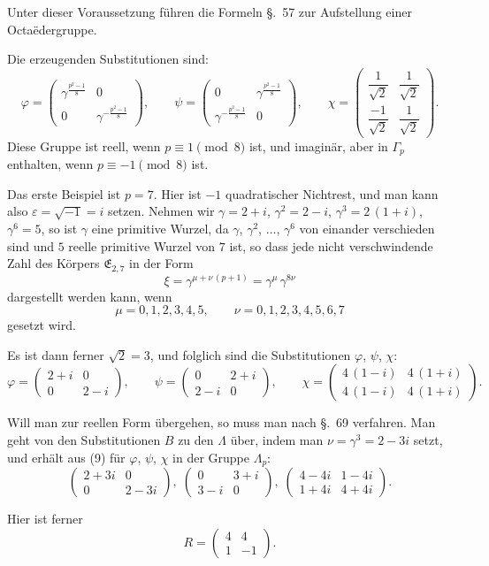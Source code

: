\documentclass[12pt,a4paper]{article}
\begin{document}
\newpage
{}

Unter dieser Voraussetzung führen die Formeln \S.~57 zur Aufstellung einer Octaëdergruppe.

Die erzeugenden Substitutionen sind:
\[
\varphi = \begin{pmatrix}
\gamma^{\frac{p^{2}-1}{8}}&0\\[4pt]
0&\gamma^{-\frac{p^{2}-1}{8}}
\end{pmatrix},\qquad
\psi = \begin{pmatrix}
0&\gamma^{\frac{p^{2}-1}{8}}\\[4pt]
\gamma^{-\frac{p^{2}-1}{8}}&0
\end{pmatrix},\qquad
\chi = \begin{pmatrix}
\dfrac{1}{\sqrt{2}}&\dfrac{1}{\sqrt{2}}\\[8pt]
\dfrac{-1}{\sqrt{2}}&\dfrac{1}{\sqrt{2}}
\end{pmatrix}.
\]
Diese Gruppe ist reell, wenn $p \equiv 1 \pmod{8}$ ist, und imaginär, aber in $\varGamma_{p}$ enthalten, wenn $p \equiv -1 \pmod{8}$ ist.

Das erste Beispiel ist $p = 7$. Hier ist $-1$ quadratischer Nichtrest, und man kann also $\varepsilon = \sqrt{-1} = i$ setzen. Nehmen wir $\gamma = 2 + i$, $\gamma^{2} = 2 - i$, $\gamma^{3} = 2\,(1+i)$, $\gamma^{6} = 5$, so ist $\gamma$ eine primitive Wurzel, da $\gamma$, $\gamma^{2}$, $\ldots$, $\gamma^{6}$ von einander verschieden sind und $5$ reelle primitive Wurzel von $7$ ist, so dass jede nicht verschwindende Zahl des Körpers $\mathfrak{E}_{2,7}$ in der Form
\[
\xi = \gamma^{\mu + \nu\,(p+1)} = \gamma^{\mu}\,\gamma^{8\nu}
\]
dargestellt werden kann, wenn
\[
\mu = 0, 1, 2, 3, 4, 5,\qquad
\nu = 0, 1, 2, 3, 4, 5, 6, 7
\]
gesetzt wird.

Es ist dann ferner $\sqrt{2} = 3$, und folglich sind die Substitutionen $\varphi$, $\psi$, $\chi$:
\[
\varphi = \begin{pmatrix}2+i&0\\0&2-i\end{pmatrix},\qquad
\psi = \begin{pmatrix}0&2+i\\2-i&0\end{pmatrix},\qquad
\chi = \begin{pmatrix}4\,(1-i)&4\,(1+i)\\4\,(1-i)&4\,(1+i)\end{pmatrix}.
\]

Will man zur reellen Form übergehen, so muss man nach \S.~69 verfahren. Man geht von den Substitutionen $B$ zu den $\varLambda$ über, indem man $\nu = \gamma^{3} = 2 - 3i$ setzt, und erhält aus (9) für $\varphi$, $\psi$, $\chi$ in der Gruppe $\varLambda_{p}$:
\[
\begin{pmatrix}2+3i&0\\0&2-3i\end{pmatrix},\;
\begin{pmatrix}0&3+i\\3-i&0\end{pmatrix},\;
\begin{pmatrix}4-4i&1-4i\\1+4i&4+4i\end{pmatrix}.
\]

Hier ist ferner
\[
R = \begin{pmatrix}4&4\\1&-1\end{pmatrix}.
\]
\end{document}
